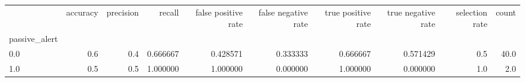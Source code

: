 \begin{tabular}{lrrrrrrrrr}
\toprule
{} &  accuracy &  precision &    recall &  false positive rate &  false negative rate &  true positive rate &  true negative rate &  selection rate &  count \\
passive\_alert &           &            &           &                      &                      &                     &                     &                 &        \\
\midrule
0.0           &       0.6 &        0.4 &  0.666667 &             0.428571 &             0.333333 &            0.666667 &            0.571429 &             0.5 &   40.0 \\
1.0           &       0.5 &        0.5 &  1.000000 &             1.000000 &             0.000000 &            1.000000 &            0.000000 &             1.0 &    2.0 \\
\bottomrule
\end{tabular}
